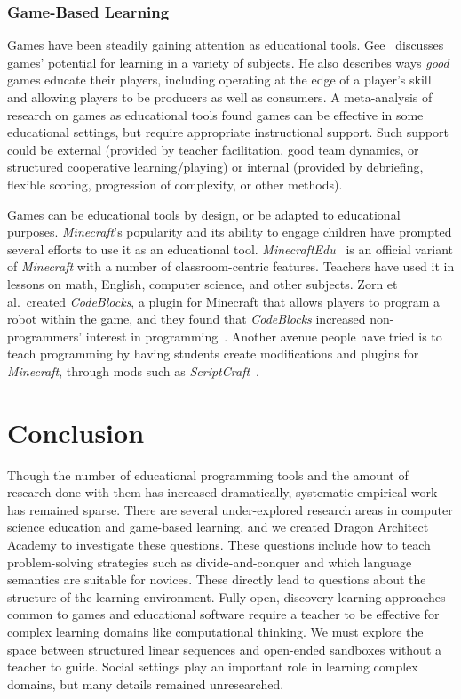 \documentclass{sig-alternate}
\newcommand{\gametitle}{{\color{RoyalPurple} Dragon Architect Academy}}
\begin{document}
\subsubsection{Game-Based Learning}
Games have been steadily gaining attention as educational tools. 
Gee~\cite{gee2003video} discusses games' potential for learning in a variety of subjects. 
He also describes ways \emph{good} games educate their players, including operating at the edge of a player's skill and allowing players to be producers as well as consumers. 
A meta-analysis of research on games as educational tools \cite{ke2009qualitative} found games can be effective in some educational settings, but require appropriate instructional support.
Such support could be external (provided by teacher facilitation, good team dynamics, or structured cooperative learning/playing) or internal (provided by debriefing, flexible scoring, progression of complexity, or other methods).

Games can be educational tools by design, or be adapted to educational purposes. 
\emph{Minecraft}'s popularity and its ability to engage children have prompted several efforts to use it as an educational tool.
\emph{MinecraftEdu}~\cite{minecraftedu} is an official variant of \emph{Minecraft} with a number of classroom-centric features. 
Teachers have used it in lessons on math, English, computer science, and other subjects.  
Zorn et al.\ created \emph{CodeBlocks}, a plugin for Minecraft that allows players to program a robot within the game, and they found that \emph{CodeBlocks} increased non-programmers' interest in programming~\cite{zorn2013minecraft}.
Another avenue people have tried is to teach programming by having students create modifications and plugins for \emph{Minecraft}, through mods such as \emph{ScriptCraft}~\cite{scriptcraft}.

\section{Conclusion}

Though the number of educational programming tools and the amount of research done with them has increased dramatically, systematic empirical work has remained sparse.
There are several under-explored research areas in computer science education and game-based learning, and we created \gametitle{} to investigate these questions.
These questions include how to teach problem-solving strategies such as divide-and-conquer and which language semantics are suitable for novices.
These directly lead to questions about the structure of the learning environment.
Fully open, discovery-learning approaches common to games and educational software require a teacher to be effective for complex learning domains like computational thinking.
We must explore the space between structured linear sequences and open-ended sandboxes without a teacher to guide.
Social settings play an important role in learning complex domains, but many details remained unresearched.
\end{document}
